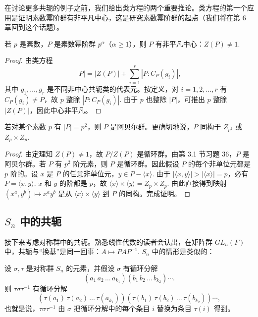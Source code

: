 在讨论更多共轭的例子之前，我们给出类方程的两个重要推论。类方程的第一个应用是证明素数幂阶群有非平凡中心，这是研究素数幂阶群的起点（我们将在第 6 章回到这个话题）。

\begin{theorem}\label{thm:4.8}
若 \(p\) 是素数，\(P\) 是素数幂阶群 \(p^\alpha\)（\(\alpha \geq 1\)），则 \(P\) 有非平凡中心：\(Z(P) \neq 1\).
\end{theorem}

\begin{proof}
由类方程
\[
|P| = |Z(P)| + \sum_{i=1}^{r} |P : C_P(g_i)|,
\]
其中 \(g_1, \ldots, g_r\) 是不同非中心共轭类的代表元。按定义，对 \(i = 1, 2, \ldots, r\) 有 \(C_P(g_i) \neq P\)，故 \(p\) 整除 \(|P : C_P(g_i)|\). 由于 \(p\) 也整除 \(|P|\)，可推出 \(p\) 整除 \(|Z(P)|\)，因此中心非平凡。
\end{proof}

\begin{corollary}\label{cor:4.9}
若对某个素数 \(p\) 有 \(|P| = p^2\)，则 \(P\) 是阿贝尔群。更确切地说，\(P\) 同构于 \(Z_{p^2}\) 或 \(Z_p \times Z_p\).
\end{corollary}

\begin{proof}
由定理知 \(Z(P) \neq 1\)，故 \(P/Z(P)\) 是循环群。由第 3.1 节习题 36，\(P\) 是阿贝尔群。若 \(P\) 有 \(p^2\) 阶元素，则 \(P\) 是循环群。因此假设 \(P\) 的每个非单位元都是 \(p\) 阶的。设 \(x\) 是 \(P\) 的任意非单位元，\(y \in P - \langle x \rangle\). 由于 \(|\langle x, y \rangle| > |\langle x \rangle| = p\)，必有 \(P = \langle x, y \rangle\). \(x\) 和 \(y\) 的阶都是 \(p\)，故 \(\langle x \rangle \times \langle y \rangle = Z_p \times Z_p\). 由此直接得到映射 \((x^a, y^b) \mapsto x^a y^b\) 是从 \(\langle x \rangle \times \langle y \rangle\) 到 \(P\) 的同构。完成证明。
\end{proof}

\subsection*{\(S_n\) 中的共轭}

接下来考虑对称群中的共轭。熟悉线性代数的读者会认出，在矩阵群 \(GL_n(F)\) 中，共轭与“换基”是同一回事：\(A \mapsto PAP^{-1}\). \(S_n\) 中的情形是类似的：

\begin{proposition}\label{pro:4.10}
设 \(\sigma, \tau\) 是对称群 \(S_n\) 的元素，并假设 \(\sigma\) 有循环分解
\[
(a_1\, a_2\, \ldots\, a_{k_1})(b_1\, b_2\, \ldots\, b_{k_2}) \cdots .
\]
则 \(\tau\sigma\tau^{-1}\) 有循环分解
\[
(\tau(a_1)\, \tau(a_2)\, \ldots\, \tau(a_{k_1}))(\tau(b_1)\, \tau(b_2)\, \ldots\, \tau(b_{k_2})) \cdots,
\]
也就是说，\(\tau\sigma\tau^{-1}\) 由 \(\sigma\) 把循环分解中的每个条目 \(i\) 替换为条目 \(\tau(i)\) 得到。
\end{proposition}

